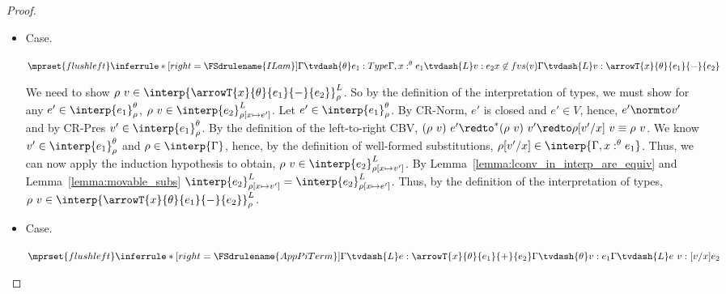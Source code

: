 \begin{proof}
\begin{itemize}
  \item[]Case.\ \\
    \begin{center}
      \begin{math}
        $$\mprset{flushleft}
        \inferrule* [right=\FSdrulename{ILam}] {
          \Gamma \tvdash{\theta} e_1:Type
          \\\\
          \Gamma,x:^\theta e_1 \tvdash{L} v:e_2
          \\\\
          x \not \in fvs(v)
        }{\Gamma \tvdash{L} v:\arrowT{x}{\theta}{e_1}{-}{e_2}}
      \end{math}
    \end{center}
    We need to show 
    $\rho\ v \in \interp{\arrowT{x}{\theta}{e_1}{-}{e_2}}^{L}_\rho$.  So by the
    definition of the interpretation of types, we must show for any
    $e' \in \interp{e_1}^\theta_\rho$, $\rho\ v \in
    \interp{e_2}^{L}_{\rho[x \mapsto e']}$.  Let $e' \in
    \interp{e_1}^\theta_\rho$.  By CR-Norm, $e'$ is closed and $e' \in V$,
    hence, $e' \normto v'$ and by CR-Pres $v' \in \interp{e_1}^\theta_\rho$.
    By the definition of the left-to-right CBV, 
    $(\rho\ v)\ e' \redto^* (\rho\ v)\ v' \redto \rho[v'/x]\ v \equiv \rho\ v$.  We
    know $v' \in \interp{e_1}^\theta_\rho$ and $\rho \in
    \interp{\Gamma}$, hence, by the definition of well-formed
    substitutions, $\rho[v'/x] \in \interp{\Gamma,x:^\theta e_1}$.  Thus, 
    we can now apply the induction hypothesis to obtain, $\rho\ v \in
    \interp{e_2}^L_{\rho[x \mapsto v']}$. By 
    Lemma~\ref{lemma:lconv_in_interp_are_equiv} and Lemma~\ref{lemma:movable_subs} 
    $\interp{e_2}^L_{\rho[x \mapsto v']} = \interp{e_2}^L_{\rho[x \mapsto e']}$.  
    Thus, by the definition of the interpretation of types, $\rho\ v \in
    \interp{\arrowT{x}{\theta}{e_1}{-}{e_2}}^{L}_\rho$.

  \item[]Case.\ \\
    \begin{center}
      \begin{math}
        $$\mprset{flushleft}
        \inferrule*[right=\FSdrulename{AppPiTerm}]{
          \Gamma \tvdash{L} e:\arrowT{x}{\theta}{e_1}{+}{e_2}
          \\\\
          \Gamma \tvdash{\theta} v:e_1
        }{\Gamma \tvdash{L} e\ v:[v/x]e_2}
      \end{math}
    \end{center}



\end{itemize}
\end{proof}
